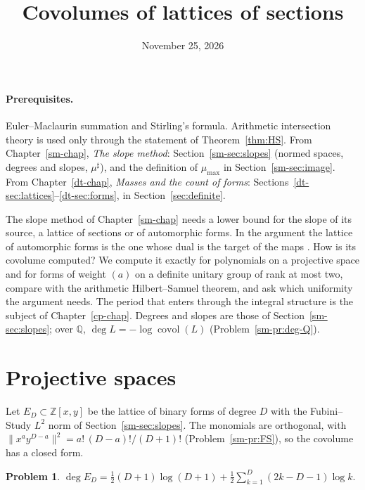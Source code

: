 \documentclass[reqno]{amsart}
\title{Covolumes of lattices of sections}
\author{}
\date{November 25, 2026}
\newcounter{chap}
\theoremstyle{definition}
\newtheorem{problem}{Problem}[section]
\theoremstyle{plain}
\newcommand{\Z}{\mathbb{Z}}
\newcommand{\Q}{\mathbb{Q}}
\newcommand{\mumax}{\mu_{\max}}
\newcommand{\covol}{\operatorname{covol}}
\begin{document}
\maketitle
{}\label{chap}

\paragraph{Prerequisites.}
Euler--Maclaurin summation and Stirling's formula.  Arithmetic intersection theory is used only through the statement of Theorem~\ref{thm:HS}.  From Chapter~\ref{sm-chap}, \emph{The slope method}: Section~\ref{sm-sec:slopes} (normed spaces, degrees and slopes, \(\mu^\sharp\)), and the definition of \(\mumax\) in Section~\ref{sm-sec:image}.  From Chapter~\ref{dt-chap}, \emph{Masses and the count of forms}: Sections~\ref{dt-sec:lattices}--\ref{dt-sec:forms}, in Section~\ref{sec:definite}.

The slope method of Chapter~\ref{sm-chap} needs a lower bound for the slope of its source, a lattice of sections or of automorphic forms.  In the argument the lattice of automorphic forms is the one whose dual is the target of the maps \cite[\S15.4]{Adr}.  How is its covolume computed?  We compute it exactly for polynomials on a projective space and for forms of weight \((a)\) on a definite unitary group of rank at most two, compare with the arithmetic Hilbert--Samuel theorem, and ask which uniformity the argument needs.  The period that enters through the integral structure is the subject of Chapter~\ref{cp-chap}.  Degrees and slopes are those of Section~\ref{sm-sec:slopes}; over \(\Q\), \(\deg L = -\log\covol(L)\) (Problem~\ref{sm-pr:deg-Q}).

\section{Projective spaces}\label{sec:P1}

Let \(E_D \subset \Z[x, y]\) be the lattice of binary forms of degree \(D\) with the Fubini--Study \(L^2\) norm of Section~\ref{sm-sec:slopes}.  The monomials are orthogonal, with \(\lVert x^a y^{D-a} \rVert^2 = a!\,(D-a)!/(D+1)!\) (Problem~\ref{sm-pr:FS}), so the covolume has a closed form.

\begin{problem}\label{pr:degED}
\(\displaystyle \deg E_D = \tfrac12 (D+1)\log(D+1) + \tfrac12 \sum_{k=1}^{D} (2k - D - 1) \log k .\)
\end{problem}
\end{document}

